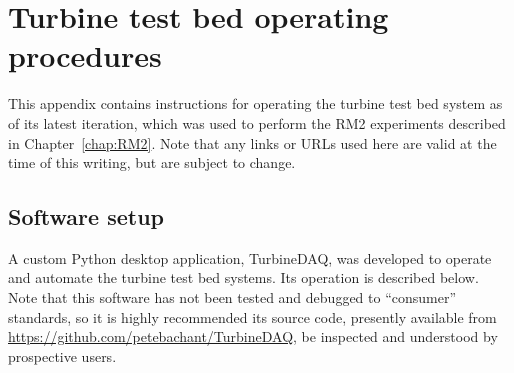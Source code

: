 \chapter{Turbine test bed operating procedures}
\doublespace

This appendix contains instructions for operating the turbine test bed system as
of its latest iteration, which was used to perform the RM2 experiments described
in Chapter~\ref{chap:RM2}. Note that any links or URLs used here are valid at
the time of this writing, but are subject to change.


\section{Software setup}

A custom Python desktop application, TurbineDAQ, was developed to operate and
automate the turbine test bed systems. Its operation is described below. Note
that this software has not been tested and debugged to ``consumer'' standards,
so it is highly recommended its source code, presently available from
\url{https://github.com/petebachant/TurbineDAQ}, be inspected and understood by
prospective users.






